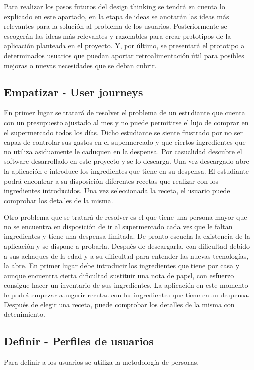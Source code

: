 Para realizar los pasos futuros del \gls{design thinking} se tendrá en cuenta lo explicado en este apartado, en la etapa de ideas se anotarán las ideas más relevantes para la solución al problema de los usuarios. Posteriormente se escogerán las ideas más relevantes y razonables para crear prototipos de la aplicación planteada en el proyecto. Y, por último, se presentará el prototipo a determinados usuarios que puedan aportar retroalimentación útil para posibles mejoras o nuevas necesidades que se deban cubrir.

\subsection{Empatizar - User journeys}

En primer lugar se tratará de resolver el problema de un estudiante que cuenta con un presupuesto ajustado al mes y no puede permitirse el lujo de comprar en el supermercado todos los días. Dicho estudiante se siente frustrado por no ser capaz de controlar sus gastos en el supermercado y que ciertos ingredientes que no utiliza asiduamente le caduquen en la despensa. Por casualidad descubre el software desarrollado en este proyecto y se lo descarga. Una vez descargado abre la aplicación e introduce los ingredientes que tiene en su despensa. El estudiante podrá encontrar a su disposición diferentes recetas que realizar con los ingredientes introducidos. Una vez seleccionada la receta, el usuario puede comprobar los detalles de la misma.

Otro problema que se tratará de resolver es el que tiene una persona mayor que no se encuentra en disposición de ir al supermercado cada vez que le faltan ingredientes y tiene una despensa limitada. De pronto escucha la existencia de la aplicación y se dispone a probarla. Después de descargarla, con dificultad debido a sus achaques de la edad y a su dificultad para entender las nuevas tecnologías, la abre. En primer lugar debe introducir los ingredientes que tiene por casa y aunque encuentra cierta dificultad sustituir una nota de papel, con esfuerzo consigue hacer un inventario de sus ingredientes. La aplicación en este momento le podrá empezar a sugerir recetas con los ingredientes que tiene en su despensa. Después de elegir una receta, puede comprobar los detalles de la misma con detenimiento.

\subsection{Definir - Perfiles de usuarios}
Para definir a los usuarios se utiliza la metodología de personas. 

